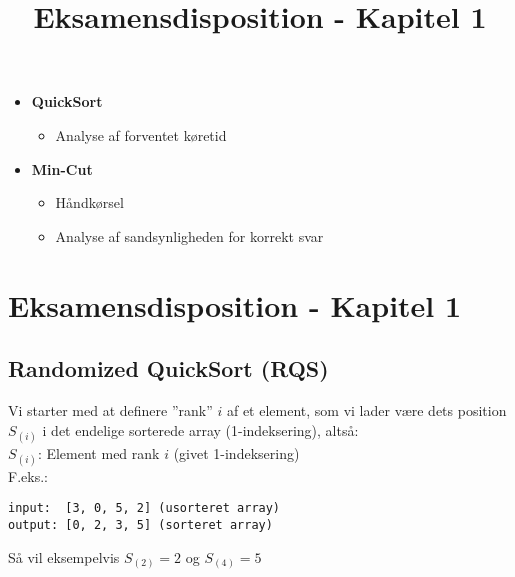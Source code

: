
\title{Eksamensdisposition - Kapitel 1}


\maketitle


\begin{itemize}
  \item \textbf{QuickSort}
  \begin{itemize}
    \item Analyse af forventet køretid
  \end{itemize}

  \item \textbf{Min-Cut}
  \begin{itemize}
    \item Håndkørsel
    \item Analyse af sandsynligheden for korrekt svar
  \end{itemize}
\end{itemize}

\newpage
\section{Eksamensdisposition - Kapitel 1}

\subsection{Randomized QuickSort (RQS)}

Vi starter med at definere ''rank'' $i$ af et element, som vi lader være dets position $S_{(i)}$ i det endelige sorterede array (1-indeksering), altså:\\

$S_{(i)}$: Element med rank $i$ (givet 1-indeksering)\\

F.eks.:
\begin{verbatim}
input:  [3, 0, 5, 2] (usorteret array)
output: [0, 2, 3, 5] (sorteret array)
\end{verbatim}
Så vil eksempelvis $S_{(2)} = 2$ og $S_{(4)} = 5$\\


